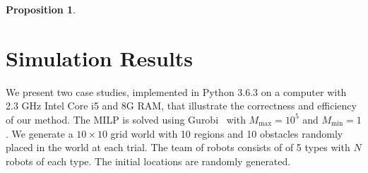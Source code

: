 \documentclass[Afour,sageh,times]{sagej}
\newtheorem{prop}[thm]{Proposition}
\newcommand{\RNum}[1]{\uppercase\expandafter{\romannumeral #1\relax}}
\begin{document}
{\begin{prop}

\end{prop}

\section{Simulation Results}\label{sec:sim}
We present two case studies, implemented in Python 3.6.3 on a computer with 2.3 GHz Intel Core i5 and 8G RAM, that illustrate the correctness and efficiency of our method. The MILP is solved using Gurobi~\cite{gurobi} with $M_{\text{max}}=10^5$ and $M_{\text{min}}=1$. We generate a  $10\times 10$ grid world with 10 regions and 10 obstacles randomly placed in the world at each trial. The team of robots consists of of 5 types with $N$ robots of each type. The initial locations are randomly generated.


}
\end{document}
